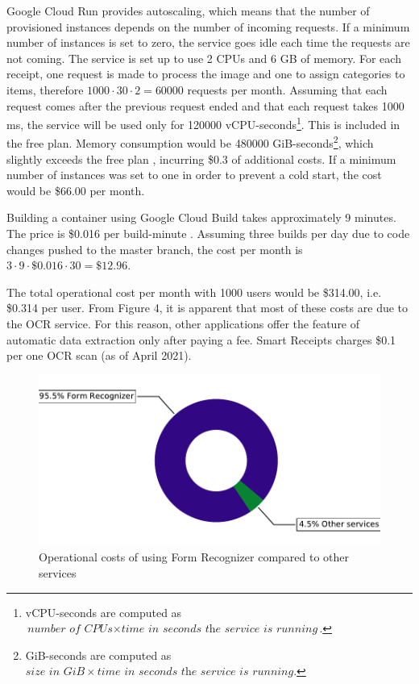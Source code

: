 \documentclass[
  digital, %
  table,   %
  oneside, %
  lof,     %
  lot,     %
]{fithesis3}
\begin{document}
Google Cloud Run provides autoscaling, which means that the number of provisioned instances depends on the number of incoming requests. If a minimum number of instances is set to zero, the service goes idle each time the requests are not coming. The service is set up to use 2 CPUs and 6 GB of memory. For each receipt, one request is made to process the image and one to assign categories to items, therefore $\num{1000}\cdot30\cdot2 = \num{60000}$ requests per month. Assuming that each request comes after the previous request ended and that each request takes \num{1000} ms, the service will be used only for \num{120000} vCPU-seconds\footnote{vCPU-seconds are computed as $\textit{number of CPUs} \times \textit{time in seconds the service is running}$.}. This is included in the free plan. Memory consumption would be \num{480000} GiB-seconds\footnote{GiB-seconds are computed as $\textit{size in GiB} \times \textit{time in seconds the service is running}.$}, which slightly exceeds the free plan \cite{CloudRunPricing}, incurring \$0.3 of additional costs. 
If a minimum number of instances was set to one in order to prevent a cold start, the cost would be \$66.00 per month.

Building a container using Google Cloud Build takes approximately 9 minutes. The price is \$0.016 per build-minute \cite{CloudBuildPricing}. Assuming three builds per day due to code changes pushed to the master branch, the cost per month is $3\cdot9\cdot\$0.016\cdot30 = \$12.96$.

The total operational cost per month with \num{1000} users would be \$314.00, i.e. \$0.314 per user.
From Figure 4, it is apparent that most of these costs are due to the OCR service. For this reason, other applications offer the feature of automatic data extraction only after paying a fee. Smart Receipts charges \$0.1 per one OCR scan (as of April 2021).

\begin{figure}
    \begin{center}
        \includegraphics[width=1\textwidth]{figures/graphs/operational_costs}
    \end{center}
    \caption{Operational costs of using Form Recognizer compared to other services}
    \label{fig:operational_costs}
\end{figure}
\end{document}
